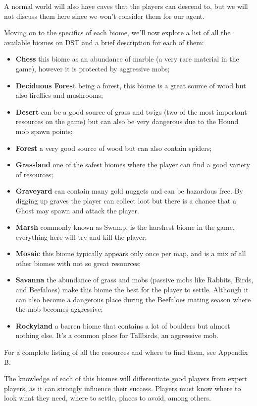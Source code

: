 A normal world will also have caves that the players can descend to, but we will not discuss them here since we won't consider them for our agent.

Moving on to the specifics of each biome, we'll now explore a list of all the available biomes on \ac{DST} and a brief description for each of them:

\begin{itemize}
\item \textbf{Chess} this biome as an abundance of marble (a very rare material in the game), however it is protected by aggressive mobs;
\item \textbf{Deciduous Forest} being a forest, this biome is a great source of wood but also fireflies and mushrooms;
\item \textbf{Desert} can be a good source of grass and twigs (two of the most important resources on the game) but can also be very dangerous due to the Hound mob spawn points;
\item \textbf{Forest} a very good source of wood but can also contain spiders;
\item \textbf{Grassland} one of the safest biomes where the player can find a good variety of resources;
\item \textbf{Graveyard} can contain many gold nuggets and can be hazardous free.
By digging up graves the player can collect loot but there is a chance that a Ghost may spawn and attack the player.
\item \textbf{Marsh} commonly known as Swamp, is the harshest biome in the game, everything here will try and kill the player;
\item \textbf{Mosaic} this biome typically appears only once per map, and is a mix of all other biomes with not so great resources;
\item \textbf{Savanna} the abundance of grass and mobs (passive mobs like Rabbits, Birds, and Beefaloes) make this biome the best for the player to settle.
Although it can also become a dangerous place during the Beefaloes mating season where the mob becomes aggressive;
\item \textbf{Rockyland} a barren biome that contains a lot of boulders but almost nothing else. It’s a common place for Tallbirds, an aggressive mob.
\end{itemize}

For a complete listing of all the resources and where to find them, see Appendix B.

The knowledge of each of this biomes will differentiate good players from expert players, as it can strongly influence their success.
Players must know where to look what they need, where to settle, places to avoid, among others.

